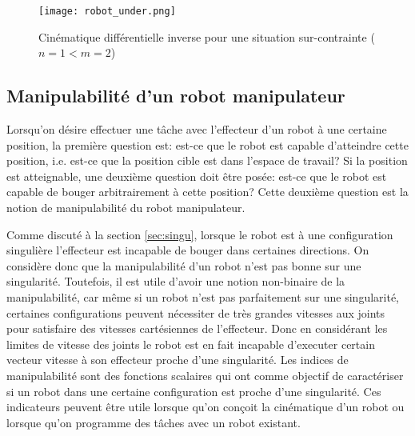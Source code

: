 \begin{example}
\begin{figure}[H]
	\centering
		\texttt{[image: robot\_under.png]}
	\caption{Cinématique différentielle inverse pour une situation sur-contrainte ($n=1<m=2$)}
	\label{fig:robot_under}
\end{figure}
\end{example}


\newpage
\subsection{Manipulabilité d'un robot manipulateur}
\label{sec:velocitymanipulability}

Lorsqu'on désire effectuer une tâche avec l'effecteur d'un robot à une certaine position, la première question est: est-ce que le robot est capable d'atteindre cette position, i.e. est-ce que la position cible est dans l'espace de travail? Si la position est atteignable, une deuxième question doit être posée: est-ce que le robot est capable de bouger arbitrairement à cette position? Cette deuxième question est la notion de manipulabilité du robot manipulateur. 

Comme discuté à la section \ref{sec:singu}, lorsque le robot est à une configuration singulière l'effecteur est incapable de bouger dans certaines directions. On considère donc que la manipulabilité d'un robot n'est pas bonne sur une singularité. Toutefois, il est utile d'avoir une notion non-binaire de la manipulabilité, car même si un robot n'est pas parfaitement sur une singularité, certaines configurations peuvent nécessiter de très grandes vitesses aux joints pour satisfaire des vitesses cartésiennes de l'effecteur. Donc en considérant les limites de vitesse des joints le robot est en fait incapable d'executer certain vecteur vitesse à son effecteur proche d'une singularité. Les indices de manipulabilité sont des fonctions scalaires qui ont comme objectif de caractériser si un robot dans une certaine configuration est proche d'une singularité.  Ces indicateurs peuvent être utile lorsque qu'on conçoit la cinématique d'un robot ou lorsque qu'on programme des tâches avec un robot existant.


